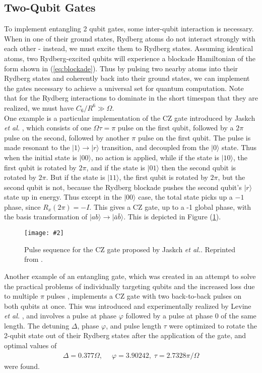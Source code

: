 \documentclass[aps,twocolumn,preprintnumbers]{revtex4}
\newcommand{\eq}{\begin{equation}\begin{aligned}}
\newcommand{\qe}{\end{aligned}\end{equation}}
\newcommand{\ket}[1]{|#1\rangle}
\newcommand{\img}[4][0.5\textwidth]{
  \begin{figure}[h]
    \centering
    \texttt{[image: \#2]}
    \caption{#3}
    \label{#4}
  \end{figure}
}
\begin{document}
\subsection{Two-Qubit Gates}

To implement entangling 2 qubit gates, some inter-qubit interaction is necessary. When in one of their ground states, Rydberg atoms do not interact strongly with each other - instead, we must excite them to Rydberg states. Assuming identical atoms, two Rydberg-excited qubits will experience a blockade Hamiltonian of the form shown in (\ref{eq:blockade}). Thus by pulsing two nearby atoms into their Rydberg states and coherently back into their ground states, we can implement the gates necessary to achieve a universal set for quantum computation. Note that for the Rydberg interactions to dominate in the short timespan that they are realized, we must have $C_6/R^6\gg \Omega$.\\
One example is a particular implementation of the CZ gate introduced by Jaskch \textit{et al.} \cite{jaskch}, which consists of one $\Omega \tau=\pi$ pulse on the first qubit, followed by a $2\pi$ pulse on the second, followed by another $\pi$ pulse on the first qubit. The pulse is made resonant to the $\ket{1}\to\ket{r}$ transition, and decoupled from the $\ket{0}$ state. Thus when the initial state is $\ket{00}$, no action is applied, while if the state is $\ket{10}$, the first qubit is rotated by $2\pi$, and if the state is $\ket{01}$ then the second qubit is rotated by $2\pi$. But if the state is $\ket{11}$, the first qubit is rotated by $2\pi$, but the second qubit is not, because the Rydberg blockade pushes the second qubit's $\ket{r}$ state up in energy. Thus except in the $\ket{00}$ case, the total state picks up a $-1$ phase, since $R_x(2\pi)=-I$. This gives a CZ gate, up to a -1 global phase, with the basis transformation of $\ket{ab}\to\ket{\bar{a}\bar{b}}$. This is depicted in Figure (\ref{fig:cz}).\\
\img{cz.png}{Pulse sequence for the CZ gate proposed by Jaskch \textit{et al.}. Reprinted from \cite{concise}.}{fig:cz}
Another example of an entangling gate, which was created in an attempt to solve the practical problems of individually targeting qubits and the increased loss due to multiple $\pi$ pulses \cite{lukin}, implements a CZ gate with two back-to-back pulses on both qubits at once. This was introduced and experimentally realized by Levine \textit{et al.} \cite{lukin}, and involves a pulse at phase $\varphi$ followed by a pulse at phase $0$ of the same length. The detuning $\Delta$, phase $\varphi$, and pulse length $\tau$ were optimized to rotate the 2-qubit state out of their Rydberg states after the application of the gate, and optimal values of 
\eq
  \Delta=0.377\Omega,\;\quad \varphi=3.90242,\; \tau=2.7328\pi/\Omega
\qe
were found.
\end{document}
